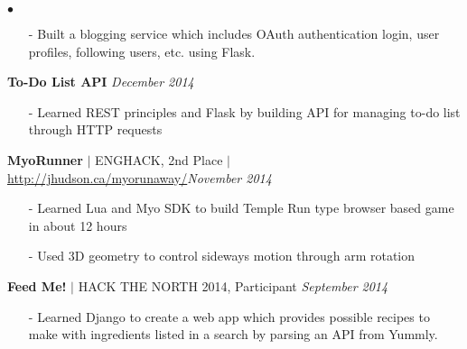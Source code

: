 \documentclass[10pt]{article}
\newenvironment{achievements}{\begin{list}{$\bullet$}{\topsep 0pt \itemsep -1.5pt \leftmargin 5pt}}{\vspace*{4pt}\end{list}}
\begin{document}
\begin{achievements}
\begin{itemize}
\item[-]Built a blogging service which includes OAuth authentication login, user profiles, following users, etc. using Flask.
\end{itemize}
\item \textbf{To-Do List API}  \hfill \textit {December 2014}
\begin{itemize}
\item[-]Learned REST principles and Flask by building API for managing to-do list through HTTP requests
\end{itemize}
\item\textbf{MyoRunner}  {$|$ \scriptsize ENGHACK, 2nd Place $|$ }  \url{http://jhudson.ca/myorunaway/}\hfill \textit {November 2014}
\begin{itemize}
\item[-]Learned Lua and Myo SDK to build Temple Run type browser based game in about 12 hours
\item[-]Used 3D geometry to control sideways motion through arm rotation
\end{itemize}
\item \textbf{Feed Me!} {$|$ \scriptsize HACK THE NORTH 2014, Participant}  \hfill \textit {September 2014}
\begin{itemize}
\item[-]Learned Django to create a web app which provides possible recipes to make with ingredients listed in a search by parsing an API from Yummly.
\end{itemize}
\end{achievements}

\vspace{6pt}
\end{document}
